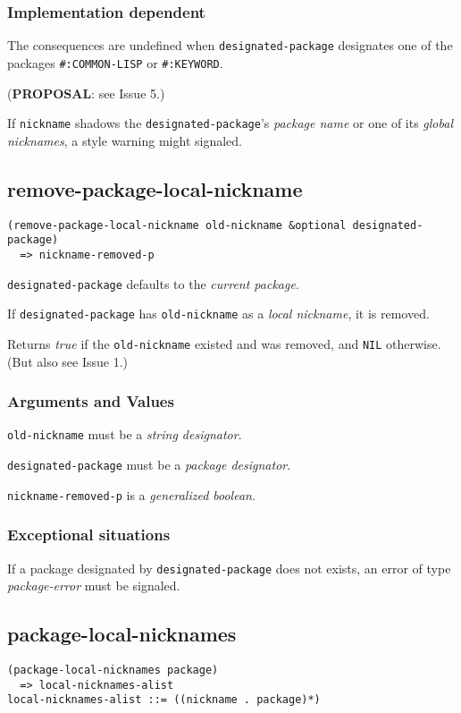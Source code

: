 \documentclass[11pt]{article}
\begin{document}
\subsubsection{Implementation dependent}
\label{sec:org6a16535}
The consequences are undefined when \texttt{designated-package} designates one of the
packages \texttt{\#:COMMON-LISP} or \texttt{\#:KEYWORD}.

(\textbf{PROPOSAL}: see Issue 5.)

If \texttt{nickname} shadows the \texttt{designated-package}'s \emph{package name} or one of its
\emph{global nicknames}, a style warning might signaled.
\subsection{remove-package-local-nickname}
\label{sec:orgb66fe32}
\begin{verbatim}
(remove-package-local-nickname old-nickname &optional designated-package)
  => nickname-removed-p
\end{verbatim}

\texttt{designated-package} defaults to the \emph{current package}.

If \texttt{designated-package} has \texttt{old-nickname} as a \emph{local nickname}, it is removed.

Returns \emph{true} if the \texttt{old-nickname} existed and was removed, and \texttt{NIL}
otherwise. (But also see Issue 1.)
\subsubsection{Arguments and Values}
\label{sec:org8f8a205}
\texttt{old-nickname} must be a \emph{string designator}.

\texttt{designated-package} must be a \emph{package designator}.

\texttt{nickname-removed-p} is a \emph{generalized boolean}.
\subsubsection{Exceptional situations}
\label{sec:orgdb907fc}
If a package designated by \texttt{designated-package} does not exists, an error of type
\emph{package-error} must be signaled.
\subsection{package-local-nicknames}
\label{sec:org1f36083}
\begin{verbatim}
(package-local-nicknames package)
  => local-nicknames-alist
local-nicknames-alist ::= ((nickname . package)*)
\end{verbatim}
\end{document}

